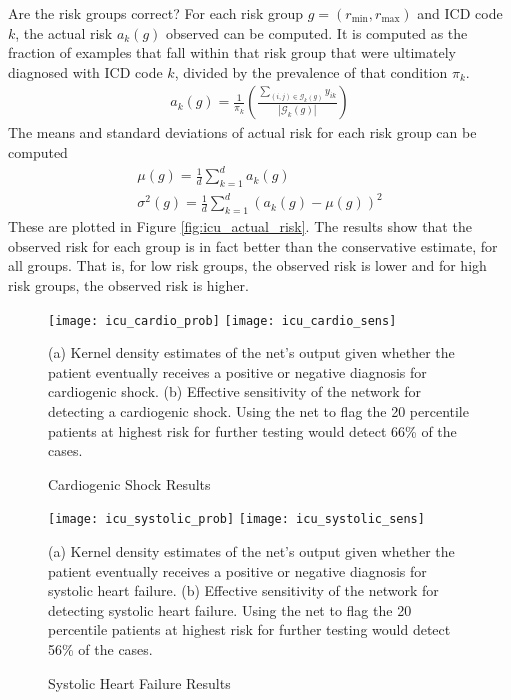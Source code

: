 Are the risk groups correct?  For each risk group $g = (r_{\min}, r_{\max})$ and ICD code $k$, the actual risk $a_k(g)$ observed can be computed.  It is computed as the fraction of examples that fall within that risk group that were ultimately diagnosed with ICD code $k$, divided by the prevalence of that condition $\pi_k$.
\begin{gather}
    a_k(g) = \frac{1}{\pi_k} \left( 
        \frac{\sum_{(i, j) \in \mathcal{G}_k(g)} y_{ik}}{|\mathcal{G}_k(g)|}
    \right)
\end{gather}
The means and standard deviations of actual risk for each risk group can be computed
\begin{gather}
    \mu(g) = \frac{1}{d} \sum_{k=1}^d a_k(g) \\
    \sigma^2(g) = \frac{1}{d} \sum_{k=1}^d (a_k(g) - \mu(g))^2
\end{gather}
These are plotted in Figure \ref{fig:icu_actual_risk}.  The results show that the observed risk for each group is in fact better than the conservative estimate, for all groups.  That is, for low risk groups, the observed risk is lower and for high risk groups, the observed risk is higher.

\begin{figure}
\texttt{[image: icu\_cardio\_prob]}
\texttt{[image: icu\_cardio\_sens]}
\caption{Cardiogenic Shock Results}
\vspace{12px}
(a) Kernel density estimates of the net's output given whether the patient eventually receives a positive or negative diagnosis for cardiogenic shock. (b) Effective sensitivity of the network for detecting a cardiogenic shock.  Using the net to flag the 20 percentile patients at highest risk for further testing would detect 66\% of the cases.
\label{fig:icu_cardio}
\end{figure}

\begin{figure}
\texttt{[image: icu\_systolic\_prob]}
\texttt{[image: icu\_systolic\_sens]}
\caption{Systolic Heart Failure Results}
\vspace{12px}
(a) Kernel density estimates of the net's output given whether the patient eventually receives a positive or negative diagnosis for systolic heart failure. (b) Effective sensitivity of the network for detecting systolic heart failure.  Using the net to flag the 20 percentile patients at highest risk for further testing would detect 56\% of the cases.
\label{fig:icu_systolic}
\end{figure}

